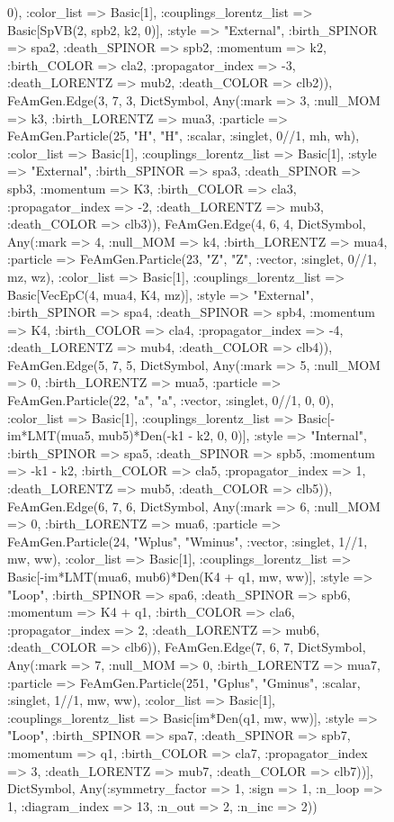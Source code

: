 \documentclass{revtex4}
\begin{document}
\begin{figure}[!htb]
\begin{center}
{0), :color_list => Basic[1], :couplings_lorentz_list => Basic[SpVB(2, spb2, k2, 0)], :style => "External", :birth_SPINOR => spa2, :death_SPINOR => spb2, :momentum => k2, :birth_COLOR => cla2, :propagator_index => -3, :death_LORENTZ => mub2, :death_COLOR => clb2)), FeAmGen.Edge(3, 7, 3, Dict{Symbol, Any}(:mark => 3, :null_MOM => k3, :birth_LORENTZ => mua3, :particle => FeAmGen.Particle(25, "H", "H", :scalar, :singlet, 0//1, mh, wh), :color_list => Basic[1], :couplings_lorentz_list => Basic[1], :style => "External", :birth_SPINOR => spa3, :death_SPINOR => spb3, :momentum => K3, :birth_COLOR => cla3, :propagator_index => -2, :death_LORENTZ => mub3, :death_COLOR => clb3)), FeAmGen.Edge(4, 6, 4, Dict{Symbol, Any}(:mark => 4, :null_MOM => k4, :birth_LORENTZ => mua4, :particle => FeAmGen.Particle(23, "Z", "Z", :vector, :singlet, 0//1, mz, wz), :color_list => Basic[1], :couplings_lorentz_list => Basic[VecEpC(4, mua4, K4, mz)], :style => "External", :birth_SPINOR => spa4, :death_SPINOR => spb4, :momentum => K4, :birth_COLOR => cla4, :propagator_index => -4, :death_LORENTZ => mub4, :death_COLOR => clb4)), FeAmGen.Edge(5, 7, 5, Dict{Symbol, Any}(:mark => 5, :null_MOM => 0, :birth_LORENTZ => mua5, :particle => FeAmGen.Particle(22, "a", "a", :vector, :singlet, 0//1, 0, 0), :color_list => Basic[1], :couplings_lorentz_list => Basic[-im*LMT(mua5, mub5)*Den(-k1 - k2, 0, 0)], :style => "Internal", :birth_SPINOR => spa5, :death_SPINOR => spb5, :momentum => -k1 - k2, :birth_COLOR => cla5, :propagator_index => 1, :death_LORENTZ => mub5, :death_COLOR => clb5)), FeAmGen.Edge(6, 7, 6, Dict{Symbol, Any}(:mark => 6, :null_MOM => 0, :birth_LORENTZ => mua6, :particle => FeAmGen.Particle(24, "Wplus", "Wminus", :vector, :singlet, 1//1, mw, ww), :color_list => Basic[1], :couplings_lorentz_list => Basic[-im*LMT(mua6, mub6)*Den(K4 + q1, mw, ww)], :style => "Loop", :birth_SPINOR => spa6, :death_SPINOR => spb6, :momentum => K4 + q1, :birth_COLOR => cla6, :propagator_index => 2, :death_LORENTZ => mub6, :death_COLOR => clb6)), FeAmGen.Edge(7, 6, 7, Dict{Symbol, Any}(:mark => 7, :null_MOM => 0, :birth_LORENTZ => mua7, :particle => FeAmGen.Particle(251, "Gplus", "Gminus", :scalar, :singlet, 1//1, mw, ww), :color_list => Basic[1], :couplings_lorentz_list => Basic[im*Den(q1, mw, ww)], :style => "Loop", :birth_SPINOR => spa7, :death_SPINOR => spb7, :momentum => q1, :birth_COLOR => cla7, :propagator_index => 3, :death_LORENTZ => mub7, :death_COLOR => clb7))], Dict{Symbol, Any}(:symmetry_factor => 1, :sign => 1, :n_loop => 1, :diagram_index => 13, :n_out => 2, :n_inc => 2)) 
}
\end{center}
\end{figure}
\end{document}
